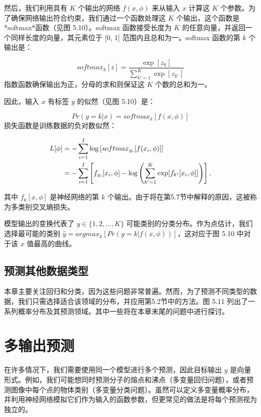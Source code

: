 \documentclass[lang=cn,newtx,10pt,scheme=chinese]{elegantbook}
\begin{document}
然后，我们利用具有 \(K\) 个输出的网络 \(f(x, \phi)\) 来从输入 \(x\) 计算这 \(K\) 个参数。为了确保网络输出符合约束，我们通过一个函数处理这 \(K\) 个输出，这个函数是*softmax*函数（见图 5.10）。softmax 函数接受长度为 \(K\) 的任意向量，并返回一个同样长度的向量，其元素位于 [0, 1] 范围内且总和为一。softmax 函数的第 \(k\) 个输出是：

\begin{equation}
softmax_k[z] = \frac{\exp[z_k]}{\sum_{k'=1}^{K} \exp[z_{k'}]} 
\end{equation}
指数函数确保输出为正，分母的求和则保证这 \(K\) 个数的总和为一。

因此，输入 \(x\) 有标签 \(y\) 的似然（见图 5.10）是：

\begin{equation}
Pr(y = k|x) = softmax_k[f(x, \phi)] 
\end{equation}
损失函数是训练数据的负对数似然：

\begin{align}
L[\phi] &= -\sum_{i=1}^{I} \log \left[ softmax_{y_i} [f(x_i, \phi)] \right] \notag \\
&= -\sum_{i=1}^{I} \left[ f_{y_i}[x_i, \phi] - \log \left( \sum_{k'=1}^{K} \exp [f_{k'}[x_i, \phi]] \right) \right],
\end{align}


其中 \(f_k[x, \phi]\) 是神经网络的第 \(k\) 个输出。由于将在第5.7节中解释的原因，这被称为多类别交叉熵损失。

模型输出的变换代表了 \(y \in \{1, 2, \ldots, K\}\) 可能类别的分类分布。作为点估计，我们选择最可能的类别 \(\hat{y} = argmax_k[Pr(y = k|f(x, \phi))]\)，这对应于图 5.10 中对于该 \(x\) 值最高的曲线。

\subsection{预测其他数据类型}

本章主要关注回归和分类，因为这些问题非常普遍。然而，为了预测不同类型的数据，我们只需选择适合该领域的分布，并应用第5.2节中的方法。图 5.11 列出了一系列概率分布及其预测领域。其中一些将在本章末尾的问题中进行探讨。

\section{多输出预测}
在许多情况下，我们需要使用同一个模型进行多个预测，因此目标输出 \(y\) 是向量形式。例如，我们可能想同时预测分子的熔点和沸点（多变量回归问题），或者预测图像中每个点的物体类别（多变量分类问题）。虽然可以定义多变量概率分布，并利用神经网络模拟它们作为输入的函数参数，但更常见的做法是将每个预测视为独立的。
\end{document}
